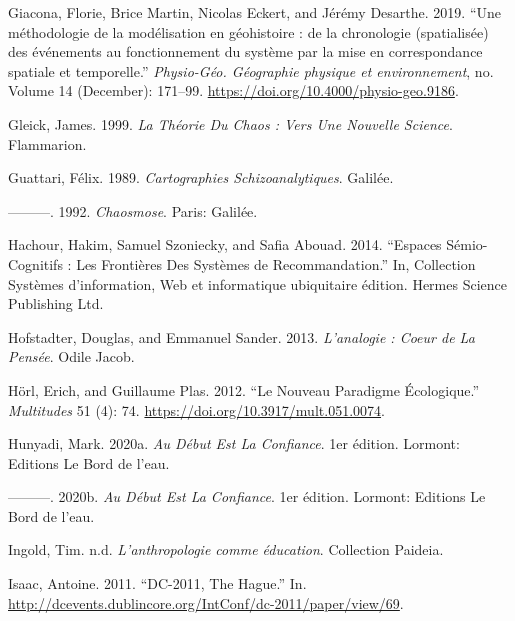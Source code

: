 \documentclass[
  letterpaper,
  DIV=11,
  numbers=noendperiod]{scrreprt}
\newlength{\cslhangindent}
\newlength{\cslentryspacingunit} %
\newenvironment{CSLReferences}[2] %
 {%
  \setlength{\parindent}{0pt}
  \ifodd #1
  \let\oldpar\par
  \def\par{\hangindent=\cslhangindent\oldpar}
  \fi
  \setlength{\parskip}{#2\cslentryspacingunit}
 }%
 {}
\begin{document}
\begin{CSLReferences}{1}{0}
\leavevmode{}%
Giacona, Florie, Brice Martin, Nicolas Eckert, and Jérémy Desarthe.
2019. {``Une méthodologie de la modélisation en géohistoire : de la
chronologie (spatialisée) des événements au fonctionnement du système
par la mise en correspondance spatiale et temporelle.''}
\emph{Physio-Géo. Géographie physique et environnement}, no. Volume 14
(December): 171--99. \url{https://doi.org/10.4000/physio-geo.9186}.

\leavevmode{}%
Gleick, James. 1999. \emph{La Théorie Du Chaos : Vers Une Nouvelle
Science}. Flammarion.

\leavevmode{}%
Guattari, Félix. 1989. \emph{Cartographies Schizoanalytiques}. Galilée.

\leavevmode{}%
---------. 1992. \emph{Chaosmose}. Paris: Galilée.

\leavevmode{}%
Hachour, Hakim, Samuel Szoniecky, and Safia Abouad. 2014. {``Espaces
Sémio-Cognitifs : Les Frontières Des Systèmes de Recommandation.''} In,
Collection Systèmes d'information, Web et informatique ubiquitaire
édition. Hermes Science Publishing Ltd.

\leavevmode{}%
Hofstadter, Douglas, and Emmanuel Sander. 2013. \emph{L'analogie : Coeur
de La Pensée}. Odile Jacob.

\leavevmode{}%
Hörl, Erich, and Guillaume Plas. 2012. {``Le Nouveau Paradigme
Écologique.''} \emph{Multitudes} 51 (4): 74.
\url{https://doi.org/10.3917/mult.051.0074}.

\leavevmode{}%
Hunyadi, Mark. 2020a. \emph{Au Début Est La Confiance}. 1er édition.
Lormont: Editions Le Bord de l'eau.

\leavevmode{}%
---------. 2020b. \emph{Au Début Est La Confiance}. 1er édition.
Lormont: Editions Le Bord de l'eau.

\leavevmode{}%
Ingold, Tim. n.d. \emph{L'anthropologie comme éducation}. Collection
Paideia.

\leavevmode{}%
Isaac, Antoine. 2011. {``DC-2011, The Hague.''} In.
\url{http://dcevents.dublincore.org/IntConf/dc-2011/paper/view/69}.


\end{CSLReferences}
\end{document}
